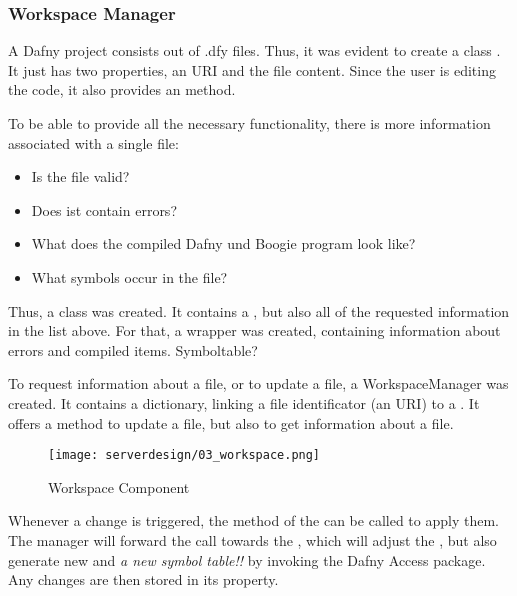 

\subsubsection{Workspace Manager}
A Dafny project consists out of .dfy files. Thus, it was evident to create a class . It just has two properties, an URI and the file content. Since the user is editing the code, it also provides an  method.

To be able to provide all the necessary functionality, there is more information associated with a single file:
\begin{itemize}
    \item Is the file valid?
    \item Does ist contain errors?
    \item What does the compiled Dafny und Boogie program look like?
    \item What symbols occur in the file? 
\end{itemize}



Thus, a class  was created. It contains a , but also all of the requested information in the list above. For that, a wrapper  was created, containing information about errors and compiled items. Symboltable?

To request information about a file, or to update a file, a WorkspaceManager was created. It contains a dictionary, linking a file identificator (an URI) to a . It offers a method to update a file, but also to get information about a file.

\begin{figure}[H]
    \centering
    \texttt{[image: serverdesign/03\_workspace.png]}
    \caption{Workspace Component}
    \label{fig:server_workspace}
\end{figure}

Whenever a change is triggered, the  method of the  can be called to apply them. The manager will forward the call towards the , which will adjust the , but also generate new  and \textit{a new symbol table!!} by invoking the Dafny Access package. Any changes are then stored in its  property.

